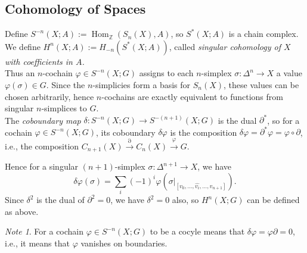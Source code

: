 \documentclass[reqno]{amsart}
\theoremstyle{definition}
\theoremstyle{remark}
\newtheorem*{note}{Note}
\DeclareMathOperator{\Hom}{Hom}
\begin{document}
    \subsection{Cohomology of Spaces}


    Define
    $S^{-n} (X;A) :=
    \Hom_{\mathbb{Z}} \left( S_n(X),A \right) $,
    so $S^{*}(X;A)$ is a chain complex.
    We define
    $H^{n}(X;A) :=
    H_{-n}\left( S^{*}(X;A) \right) $, called \textit{singular
    cohomology of $X$ with coefficients in $A$.}\\

    Thus an $n$-cochain $\varphi 
    \in S^{-n}(X;G)$ assigns to each
    $n$-simplex $\sigma \colon \Delta^{n} \to X$ a
    value $\varphi \left( \sigma \right) \in G$.
    Since the $n$-simplicies form a basis for
    $S_n(X)$, these values can be chosen arbitrarily,
    hence $n$-cochains are exactly equivalent to functions
    from singular $n$-simplices to $G$.\\
    The \textit{coboundary map} $\delta
    \colon S^{-n}(X;G) \to S^{-(n+1)}(X;G)$ is the dual
     $\partial^{*}$, so for
     a cochain $\varphi \in 
     S^{-n}(X;G)$, its coboundary $\delta
     \varphi  $ is the composition
     $\delta \varphi  = 
     \partial^{*} \varphi =
     \varphi \circ \partial$, i.e., the composition
     $C_{n+1} (X) \stackrel{\partial}{\to} 
     C_n(X) \stackrel{\varphi }{\to} G$.

     Hence for a singular $(n+1)$-simplex
     $\sigma \colon \Delta^{n+1} \to X$, we have
     \[
     \delta \varphi (\sigma) = 
     \sum_{i} (-1)^{i} 
     \varphi \left( \sigma |_{\left[ v_0, \ldots,
     \widehat{v_i}, \ldots, v_{n+1}\right] } \right).
     \] 
     Since $\delta^2$ is the dual of
     $\partial^2 = 0$, we have
     $\delta^2 = 0$ also, so
     $H^{n}(X;G)$ can be defined as above.\\
     \linebreak
     \begin{note}
         For a cochain $\varphi \in 
         S^{-n}(X;G)$ to be a cocyle means that
         $\delta \varphi = \varphi \partial = 0$, i.e.,
         it means that $\varphi $ vanishes on boundaries.
     \end{note}
\end{document}
